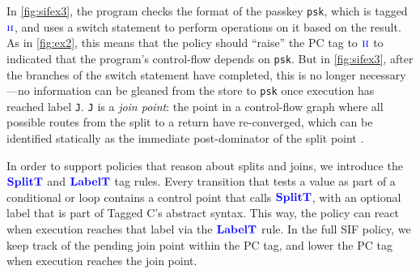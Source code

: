\documentclass{llncs}
\begin{document}
In \cref{fig:sifex3}, the program checks the format of the passkey {\tt psk}, which is tagged  \(\textnormal{\color{blue} \sc h}\),
and uses a switch statement to perform
operations on it based on the result. As in \cref{fig:ex2}, this means that the policy
should ``raise'' the PC tag to \(\textnormal{\color{blue} \sc h}\) to indicated that the program's control-flow depends on {\tt psk}.
But in \cref{fig:sifex3}, after the branches of the switch statement have completed, this is no
longer necessary---no information can be gleaned from the store to {\tt psk} once execution has
reached label {\tt J}. {\tt J} is a {\em join point}: the point in a control-flow graph where all
possible routes from the split to a return have re-converged, which can be identified
statically as the immediate post-dominator of the split point \cite{Denning77:SecureInformationFlow}.

In order to support policies that reason about splits and joins, we introduce the \(\color{blue} \mathbf{SplitT}\) and
 \(\color{blue} \mathbf{LabelT}\) tag rules. Every transition that tests a
value as part of a conditional or loop contains a control point that calls \(\color{blue} \mathbf{SplitT}\), with an
optional label that is part of Tagged C's abstract syntax. This way, the policy can react when execution
reaches that label via the \(\color{blue} \mathbf{LabelT}\) rule. In the full SIF policy, we keep track of
the pending join point within the PC tag, and lower the PC tag when execution reaches the join point.
\end{document}
